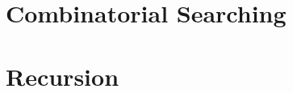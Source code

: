 \documentclass[Main.tex]{subfiles}
\begin{document}
\chapter{Combinatorial Searching}


\chapter{Recursion}

\end{document}

